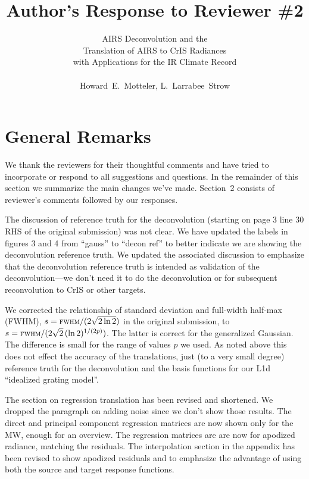 \documentclass[11pt]{article}
\begin{document}
\title{Author's Response to Reviewer \#2 }

\author{AIRS Deconvolution and the \\
       Translation of AIRS to CrIS Radiances \\ 
       with Applications for the IR Climate Record \\
       \\
       Howard~E.~Motteler, L.~Larrabee~Strow}

\maketitle

\section{General Remarks}

We thank the reviewers for their thoughtful comments and have tried
to incorporate or respond to all suggestions and questions.  In the
remainder of this section we summarize the main changes we've made.
Section~2 consists of reviewer's comments followed by our responses.

The discussion of reference truth for the deconvolution (starting on
page 3 line 30 RHS of the original submission) was not clear.  We
have updated the labels in figures 3 and 4 from ``gauss'' to ``decon
ref'' to better indicate we are showing the deconvolution reference
truth.  We updated the associated discussion to emphasize that the
deconvolution reference truth is intended as validation of the
deconvolution---we don't need it to do the deconvolution or for
subsequent reconvolution to CrIS or other targets.

We corrected the relationship of standard deviation and full-width
half-max (FWHM), $s=\mbox{\small\textsc{fwhm}} / (2\sqrt{2\ln 2})$ in the original
submission, to $s=\mbox{\small\textsc{fwhm}} / (2\sqrt{2}\,(\ln 2)^{1/(2p)})$.  The
latter is correct for the generalized Gaussian.  The difference is
small for the range of values $p$ we used.  As noted above this does
not effect the accuracy of the translations, just (to a very small
degree) reference truth for the deconvolution and the basis
functions for our L1d ``idealized grating model''.

The section on regression translation has been revised and
shortened.  We dropped the paragraph on adding noise since we don't
show those results.  The direct and principal component regression
matrices are now shown only for the MW, enough for an overview.  
The regression matrices are are now for apodized radiance, matching
the residuals.  The interpolation section in the appendix has been
revised to show apodized residuals and to emphasize the advantage of
using both the source and target response functions.
\end{document}
